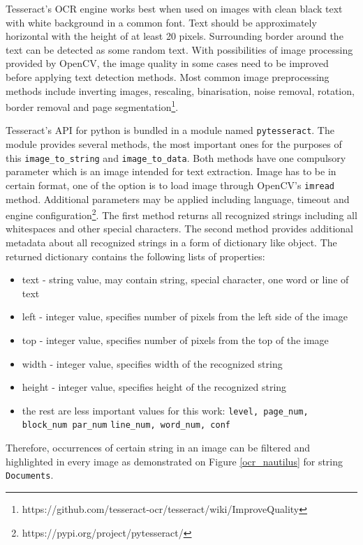 Tesseract's OCR engine works best when used on images with clean black text with white background in a common font. Text should be approximately horizontal with the height of at least 20 pixels. Surrounding border around the text can be detected as some random text. With possibilities of image processing provided by OpenCV, the image quality in some cases need to be improved before applying text detection methods. Most common image preprocessing methods include inverting images, rescaling, binarisation, noise removal, rotation, border removal and page segmentation\footnote{https://github.com/tesseract-ocr/tesseract/wiki/ImproveQuality}.

Tesseract's API for python is bundled in a module named \texttt{pytesseract}. The module provides several methods, the most important ones for the purposes of this \verb|image_to_string| and \verb|image_to_data|. Both methods have one compulsory parameter which is an image intended for text extraction. Image has to be in certain format, one of the option is to load image through OpenCV's \texttt{imread} method. Additional parameters may be applied including language, timeout and engine configuration\footnote{https://pypi.org/project/pytesseract/}. The first method returns all recognized strings including all whitespaces and other special characters. The second method provides additional metadata about all recognized strings in a form of dictionary like object. The returned dictionary contains the following lists of properties:

\begin{itemize}
    \item text - string value, may contain string, special character, one word or line of text
    \item left - integer value, specifies number of pixels from the left side of the image 
    \item top - integer value, specifies number of pixels from the top of the image
    \item width - integer value, specifies width of the recognized string 
    \item height - integer value, specifies height of the recognized string
    \item the rest are less important values for this work: \verb|level, page_num, block_num par_num| \verb|line_num, word_num, conf|
\end{itemize}

Therefore, occurrences of certain string in an image can be filtered and highlighted in every image as demonstrated on Figure \ref{ocr_nautilus} for string \verb|Documents|.

